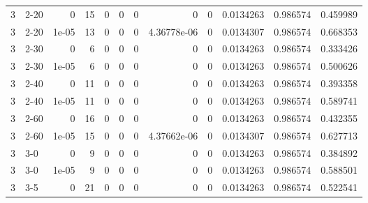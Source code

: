 \begin{tabular}{rlrrrrrrrrrr}
     3 & 2-20   &      0     &          15 &                 0 &                 0 &     0           &     0           &      0           &        0.0134263 &               0.986574 &           0.459989 \\
     3 & 2-20   &      1e-05 &          13 &                 0 &                 0 &     0           &     4.36778e-06 &      0           &        0.0134307 &               0.986574 &           0.668353 \\
     3 & 2-30   &      0     &           6 &                 0 &                 0 &     0           &     0           &      0           &        0.0134263 &               0.986574 &           0.333426 \\
     3 & 2-30   &      1e-05 &           6 &                 0 &                 0 &     0           &     0           &      0           &        0.0134263 &               0.986574 &           0.500626 \\
     3 & 2-40   &      0     &          11 &                 0 &                 0 &     0           &     0           &      0           &        0.0134263 &               0.986574 &           0.393358 \\
     3 & 2-40   &      1e-05 &          11 &                 0 &                 0 &     0           &     0           &      0           &        0.0134263 &               0.986574 &           0.589741 \\
     3 & 2-60   &      0     &          16 &                 0 &                 0 &     0           &     0           &      0           &        0.0134263 &               0.986574 &           0.432355 \\
     3 & 2-60   &      1e-05 &          15 &                 0 &                 0 &     0           &     4.37662e-06 &      0           &        0.0134307 &               0.986574 &           0.627713 \\
     3 & 3-0    &      0     &           9 &                 0 &                 0 &     0           &     0           &      0           &        0.0134263 &               0.986574 &           0.384892 \\
     3 & 3-0    &      1e-05 &           9 &                 0 &                 0 &     0           &     0           &      0           &        0.0134263 &               0.986574 &           0.588501 \\
     3 & 3-5    &      0     &          21 &                 0 &                 0 &     0           &     0           &      0           &        0.0134263 &               0.986574 &           0.522541 \\

\end{tabular}

